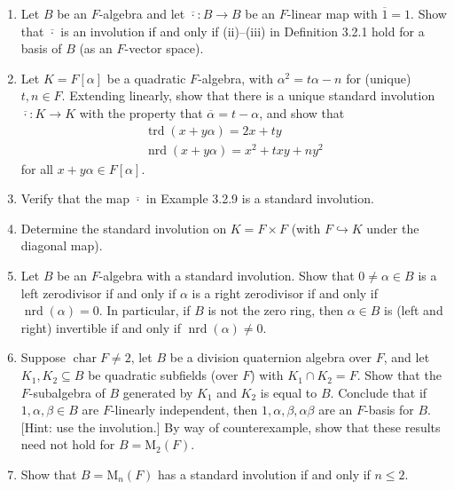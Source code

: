\documentclass{article}
\theoremstyle{definition}
\begin{document}
\begin{enumerate}
\item[\textbf{1.}] Let $B$ be an $F$-algebra and let $\overline{\cdot}: B \to B$ be an $F$-linear map with $\overline{1} = 1$. Show that $\overline{\cdot}$ is an involution if and only if (ii)--(iii) in Definition 3.2.1 hold for a basis of $B$ (as an $F$-vector space).

\item[\textbf{2.}] Let $K = F[\alpha]$ be a quadratic $F$-algebra, with $\alpha^2 = t\alpha - n$ for (unique) $t, n \in F$. Extending linearly, show that there is a unique standard involution $\overline{\cdot}: K \to K$ with the property that $\overline{\alpha} = t - \alpha$, and show that
$$\begin{array}{l} \operatorname{trd}(x + y\alpha) = 2x + ty \\ \operatorname{nrd}(x + y\alpha) = x^2 + txy + ny^2 \end{array}$$
for all $x + y\alpha \in F[\alpha]$.

\item[\textbf{3.}] Verify that the map $\overline{\cdot}$ in Example 3.2.9 is a standard involution.

\item[4.] Determine the standard involution on $K = F \times F$ (with $F \hookrightarrow K$ under the diagonal map).

\item[\textbf{5.}] Let $B$ be an $F$-algebra with a standard involution. Show that $0 \neq \alpha \in B$ is a left zerodivisor if and only if $\alpha$ is a right zerodivisor if and only if $\operatorname{nrd}(\alpha) = 0$. In particular, if $B$ is not the zero ring, then $\alpha \in B$ is (left and right) invertible if and only if $\operatorname{nrd}(\alpha) \neq 0$.

\item[6.] Suppose $\operatorname{char} F \neq 2$, let $B$ be a division quaternion algebra over $F$, and let $K_1, K_2 \subseteq B$ be quadratic subfields (over $F$) with $K_1 \cap K_2 = F$. Show that the $F$-subalgebra of $B$ generated by $K_1$ and $K_2$ is equal to $B$. Conclude that if $1, \alpha, \beta \in B$ are $F$-linearly independent, then $1, \alpha, \beta, \alpha\beta$ are an $F$-basis for $B$. [Hint: use the involution.] By way of counterexample, show that these results need not hold for $B = \mathrm{M}_2(F)$.

\item[7.] Show that $B = \mathrm{M}_n(F)$ has a standard involution if and only if $n \leq 2$.


\end{enumerate}
\end{document}
